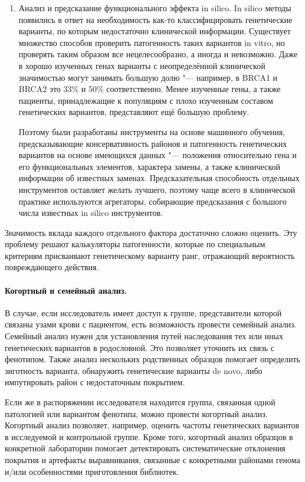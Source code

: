 \documentclass[a4paper,12pt]{article}
\begin{document}
\begin{enumerate}
\item Анализ и предсказание функционального эффекта in silico.
In silico методы появились в ответ на необходимость как-то классифицировать генетические варианты, по которым недостаточно клинической информации.
Существует множество способов проверить патогенность таких вариантов in vitro, но проверять таким образом все нецелесообразно, а иногда и невозможно.
Даже в хорошо изученных генах варианты с неопределённой клинической значимостью могут занимать большую долю "--- например, в BRCA1 и BRCA2 это 33\% и 50\% соответственно.
Менее изученные гены, а также пациенты, принадлежащие к популяциям с плохо изученным составом генетических вариантов, представляют ещё большую проблему.

Поэтому были разработаны инструменты на основе машинного обучения, предсказывающие консервативность районов и патогенность генетических вариантов на основе имеющихся данных "--- положения относительно гена и его функциональных элементов, характера замены, а также клинической информации об известных заменах\cite{brea-fernandez}.
Предсказательная способность отдельных инструментов оставляет желать лучшего, поэтому чаще всего в клинической практике используются агрегаторы, собирающие предсказания с большого числа известных in silico инструментов.
\end{enumerate}

Значимость вклада каждого отдельного фактора достаточно сложно оценить.
Эту проблему решают калькуляторы патогенности, которые по специальным критериям присваивают генетическому варианту ранг, отражающий вероятность повреждающего действия\cite{ryzhkova}.

\paragraph{Когортный и семейный анализ.}
В случае, если исследователь имеет доступ к группе, представители которой связаны узами крови с пациентом, есть возможность провести семейный анализ.
Семейный анализ нужен для установления путей наследования тех или иных генетических вариантов в родословной.
Это позволяет уточнить их связь с фенотипом.
Также анализ нескольких родственных образцов помогает определить зиготность варианта, обнаружить генетические варианты de novo, либо импутировать район с недостаточным покрытием.
 
Если же в распоряжении исследователя находится группа, связанная одной патологией или вариантом фенотипа, можно провести когортный анализ.
Когортный анализ позволяет, например, оценить частоты генетических вариантов в исследуемой и контрольной группе.
Кроме того, когортный анализ образцов в конкретной лаборатории помогает детектировать систематические отклонения покрытия и артефакты выравнивания, связанные с конкретными районами генома и/или особенностями приготовления библиотек.
\end{document}

